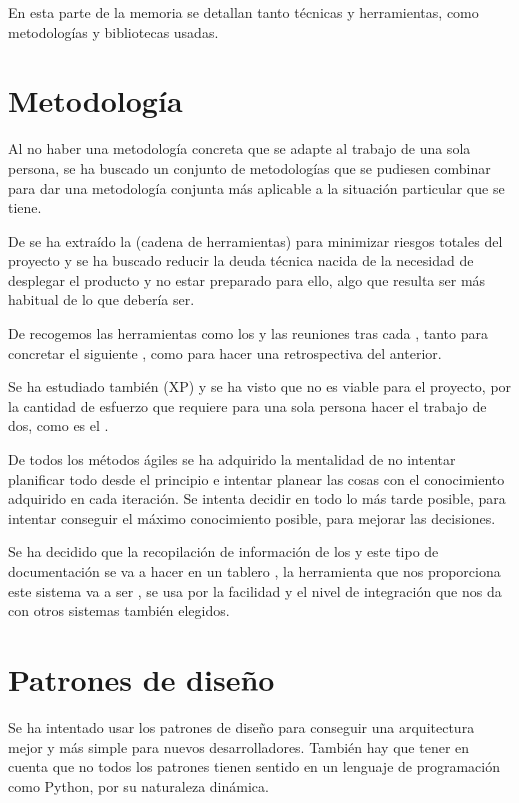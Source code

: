 
En esta parte de la memoria se detallan tanto técnicas y herramientas, como metodologías y bibliotecas usadas.


\section{Metodología}

Al no haber una metodología concreta que se adapte al trabajo de una sola persona, se ha buscado un conjunto de metodologías que se pudiesen combinar para dar una metodología conjunta más aplicable a la situación particular que se tiene. 

De  se ha extraído la  (cadena de herramientas) para minimizar riesgos totales del proyecto y se ha buscado reducir la deuda técnica nacida de la necesidad de desplegar el producto y no estar preparado para ello, algo que resulta ser más habitual de lo que debería ser.

De  recogemos las herramientas como los  y las reuniones tras cada , tanto para concretar el siguiente , como para hacer una retrospectiva del anterior. 

Se ha estudiado también  (XP) y se ha visto que no es viable para el proyecto, por la cantidad de esfuerzo que requiere para una sola persona hacer el trabajo de dos, como es el . 

De todos los métodos ágiles se ha adquirido la mentalidad de no intentar planificar todo desde el principio e intentar planear las cosas con el conocimiento adquirido en cada iteración. Se intenta decidir en todo lo más tarde posible, para intentar conseguir el máximo conocimiento posible, para mejorar las decisiones.

Se ha decidido que la recopilación de información de los  y este tipo de documentación se va a hacer en un tablero , la herramienta que nos proporciona este  sistema va a ser , se usa por la facilidad y el nivel de integración que nos da con otros sistemas también elegidos.


\section{Patrones de diseño}

Se ha intentado usar los patrones de diseño para conseguir una arquitectura mejor y más simple para nuevos desarrolladores. También hay que tener en cuenta que no todos los patrones tienen sentido en un lenguaje de programación como Python, por su naturaleza dinámica.

